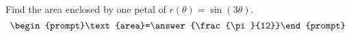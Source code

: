 \documentclass{ximera}
\author{Gregory Hartman \and Matthew Carr}
\begin{document}
\begin{exercise}





Find the area enclosed by one petal of $r(\theta)=\sin(3\theta)$.
\[
\begin{prompt}\text{area}=\answer{\frac{\pi}{12}}\end{prompt}
\]

\end{exercise}
\end{document}
